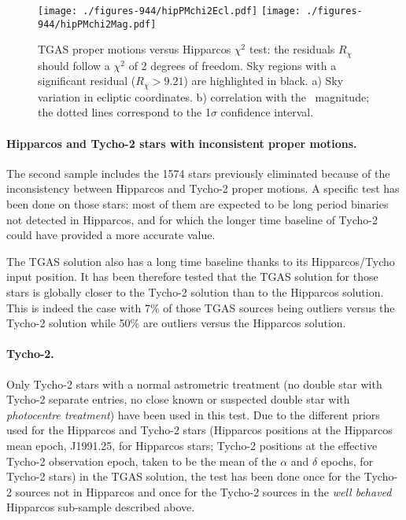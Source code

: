 \begin{figure}
    \begin{center}
        \texttt{[image: ./figures-944/hipPMchi2Ecl.pdf]}
        \texttt{[image: ./figures-944/hipPMchi2Mag.pdf]}
        \caption[TGAS versus Hipparcos astrometry]{TGAS proper motions versus Hipparcos $\chi^2$ test: the residuals $R_\chi$ should follow a $\chi^2$ of 2 degrees of freedom. Sky regions with a significant residual ($R_\chi>9.21$) are highlighted in black.  a) Sky variation in ecliptic coordinates. b) correlation with the \gmag~magnitude; the dotted lines correspond to the 1$\sigma$ confidence interval. }
        \label{fig:cu9val_wp944_hipPMchi2} 
    \end{center}
\end{figure}

\paragraph{Hipparcos and Tycho-2 stars with inconsistent proper motions.}
The second sample includes the 1574 stars previously eliminated because of the inconsistency between Hipparcos and Tycho-2 proper motions. A specific test has been done on those stars: most of them are expected to be long period binaries not detected in Hipparcos, and for which the longer time baseline of Tycho-2 could have provided a more accurate value. 

The TGAS solution also has a long time baseline thanks to its Hipparcos/Tycho input position. It has been therefore tested that the TGAS solution for those stars is globally closer to the Tycho-2 solution than to the Hipparcos solution. 
This is indeed the case with 7\% of those TGAS sources being outliers versus the Tycho-2 solution while 50\% are outliers versus the Hipparcos solution. 

\paragraph{Tycho-2.} %
Only Tycho-2 stars with a normal astrometric treatment (no double star with Tycho-2 separate entries, no close known or suspected double star with {\it photocentre treatment}) have been used in this test. Due to the different priors used for the Hipparcos and Tycho-2 stars (Hipparcos positions at the Hipparcos mean epoch, J1991.25, for Hipparcos stars; Tycho-2 positions at the effective Tycho-2 observation epoch, taken to be the mean of the $\alpha$ and $\delta$ epochs, for Tycho-2 stars) in the TGAS solution, the test has been done once for the Tycho-2 sources not in Hipparcos and once for the Tycho-2 sources in the {\it well behaved} Hipparcos sub-sample described above.  

